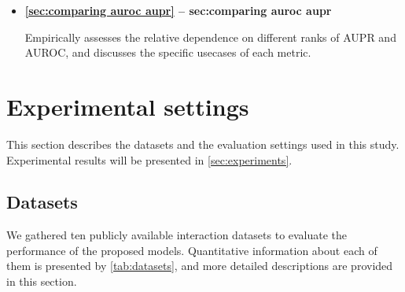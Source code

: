 \begin{mdframed}[frametitle={Related experiments}]
    \begin{itemize}
        \item \textbf{\autoref{sec:comparing auroc aupr} -- \refname{sec:comparing auroc aupr}}

        Empirically assesses the relative dependence on different ranks of AUPR and AUROC, and discusses the specific usecases of each metric.
    \end{itemize}
\end{mdframed}


\section{Experimental settings}
\label{sec:exp settings}

This section describes the datasets and the evaluation settings used in this study. Experimental results will be presented in \autoref{sec:experiments}.

\subsection{Datasets}
\label{sec:datasets}


We gathered ten publicly available interaction datasets to evaluate the performance of the proposed models. Quantitative information about each of them is presented by \autoref{tab:datasets}, and more detailed descriptions are provided in this section.

